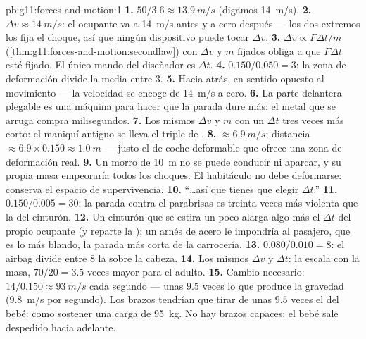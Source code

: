 \begin{solution}{pb:g11:forces-and-motion:1}
\textbf{1.} $50/3.6 \approx \qty{13.9}{m/s}$ (digamos \qty{14}{m/s}).
\textbf{2.} $\Delta v \approx \qty{14}{m/s}$: el ocupante va a
\qty{14}{m/s} antes y a cero después --- los dos extremos los fija el
choque, así que ningún dispositivo puede tocar $\Delta v$.
\textbf{3.} $\Delta v \propto F\Delta t/m$
(\cref{thm:g11:forces-and-motion:secondlaw}) con $\Delta v$ y $m$
fijados obliga a que $F\Delta t$ esté fijado. El único mando del
diseñador es $\Delta t$.
\textbf{4.} $0.150/0.050 = 3$: la zona de deformación divide la 
media entre $3$.
\textbf{5.} Hacia atrás, en sentido opuesto al movimiento --- la
velocidad se encoge de \qty{14}{m/s} a cero.
\textbf{6.} La parte delantera plegable es una máquina para hacer que la
parada dure más: el metal que se arruga compra milisegundos.
\textbf{7.} Los mismos $\Delta v$ y $m$ con un $\Delta t$ tres veces más
corto: el maniquí antiguo se lleva el triple de .
\textbf{8.}  $\approx \qty{6.9}{m/s}$; distancia
$\approx 6.9 \times 0.150 \approx \qty{1.0}{m}$ --- justo el  de
coche deformable que ofrece una zona de deformación real.
\textbf{9.} Un morro de \qty{10}{m} no se puede conducir ni aparcar, y
su propia masa empeoraría todos los choques. El habitáculo no debe
deformarse: conserva el espacio de supervivencia.
\textbf{10.} ``\dots así que tienes que elegir $\Delta t$.''
\textbf{11.} $0.150/0.005 = 30$: la parada contra el parabrisas es
treinta veces más violenta que la del cinturón.
\textbf{12.} Un cinturón que se estira un poco alarga algo más el
$\Delta t$ del propio ocupante (y reparte la ); un arnés de acero
le impondría al pasajero, que es lo más blando, la parada más corta de
la carrocería.
\textbf{13.} $0.080/0.010 = 8$: el airbag divide entre $8$ la 
sobre la cabeza.
\textbf{14.} Los mismos $\Delta v$ y $\Delta t$: la  escala con la
masa, $70/20 = 3.5$ veces mayor para el adulto.
\textbf{15.} Cambio necesario: $14/0.150 \approx \qty{93}{m/s}$ cada
segundo --- unas $9.5$ veces lo que produce la gravedad
(\qty{9.8}{m/s} por segundo). Los brazos tendrían que tirar de unas
$9.5$ veces el  del bebé: como sostener una carga de \qty{95}{kg}.
No hay brazos capaces; el bebé sale despedido hacia adelante.

\end{solution}
